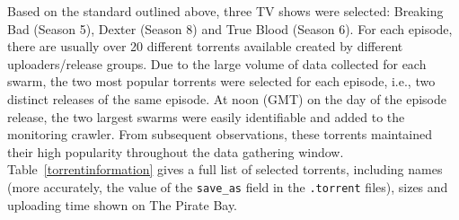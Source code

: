 \documentclass[conference]{IEEEtran}
\begin{document}
\begin{table}[!t]
\begin{footnotesize}
\renewcommand{\arraystretch}{1.0}
\caption{Torrent Information}
\label{torrentinformation}
\end{footnotesize}
\end{table}

Based on the standard outlined above, three TV shows were selected: Breaking Bad (Season 5), Dexter (Season 8) and True Blood (Season 6). For each episode, there are usually over 20 different torrents available created by different uploaders/release groups. Due to the large volume of data collected for each swarm, the two most popular torrents were selected for each episode, i.e., two distinct releases of the same episode. At noon (GMT) on the day of the episode release, the two largest swarms were easily identifiable and added to the monitoring crawler. From subsequent observations, these torrents maintained their high popularity throughout the data gathering window. Table~\ref{torrentinformation} gives a full list of selected torrents, including names (more accurately, the value of the \texttt{save\_as} field in the \texttt{.torrent} files), sizes and uploading time shown on The Pirate Bay.
\end{document}
